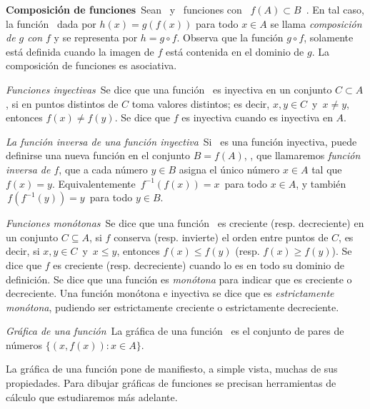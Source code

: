 \begin{defi}\textbf{{Composición de funciones}{}}\ Sean \ y
\ funciones con %
\mbox{%
$f(A)\subset B$%
}. En tal caso, la función \ dada por $h(x)=g(f(x))$
para todo $x\in A$ se llama \emph{composición de $g$ con $f$} y
se representa por $h=g\circ f$. Observa que la función $g\circ f$,
solamente está definida cuando la imagen de $f$ está contenida en
el dominio de $g$. La composición de funciones es asociativa. \end{defi} 

\begin{defi}\textit{{Funciones inyectivas}{}}\ Se dice que una
función \ es inyectiva en un conjunto $C\subset A$,
si en puntos distintos de $C$ toma valores distintos; es decir, $x,y\in C\,$
y $\,x\neq y$, entonces $f(x)\neq f(y)$. Se dice que $f$ es inyectiva
cuando es inyectiva en $A$. 

\end{defi}

\begin{defi}\textit{{La función inversa de una función inyectiva}{}}\label{funcioninversa}\ Si
\ es una función inyectiva, puede definirse una
nueva función en el conjunto $B=f(A)$, ,
que llamaremos \emph{función inversa de $f$}, que a cada número $y\in B$
asigna el único número $x\in A$ tal que $f(x)=y$. Equivalentemente
$\,f^{-1}(f(x))=x\,$ para todo $x\in A$, y también $\,f(f^{-1}(y))=y\,$
para todo $y\in B$. \end{defi}

\begin{defi}\textit{{Funciones monótonas}{}}\ Se dice que una
función \ es creciente (resp. decreciente) en
un conjunto $C\subseteq A$, si $f$ conserva (resp. invierte) el
orden entre puntos de $C$, es decir, si $x,y\in C\,$ y $\,x\leqslant y$,
entonces $f(x)\leqslant f(y)$ (resp. $f(x)\geqslant f(y)$). Se dice
que $f$ es creciente (resp. decreciente) cuando lo es en todo su
dominio de definición. Se dice que una función es \emph{monótona}
para indicar que es creciente o decreciente. Una función monótona
e inyectiva se dice que es \emph{estrictamente monótona}, pudiendo
ser estrictamente creciente o estrictamente decreciente. \end{defi}
\begin{defi}\textit{{Gráfica de una función}{}}\ La gráfica de
una función \ es el conjunto de pares de números
$\{(x,f(x)):x\in A\}$. \end{defi} La gráfica de una función pone
de manifiesto, a simple vista, muchas de sus propiedades. Para dibujar
gráficas de funciones se precisan herramientas de cálculo que estudiaremos
más adelante.

